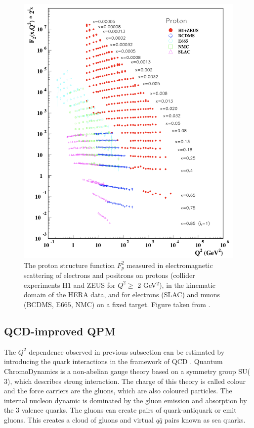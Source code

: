 \begin{figure}[!h]
  \centering
	\includegraphics[scale=0.65]{./gfx/F2.png}
	\caption{The proton structure function $F^2_p$ measured in electromagnetic scattering of electrons and positrons on protons (collider experiments H$1$ and ZEUS for $Q^2 \geq$ 2 GeV$^2$), in the kinematic domain of the HERA data, and for electrons (SLAC) and muons (BCDMS, E$665$, NMC) on a fixed target. Figure taken from \cite{PDG}.}
	\label{pic:F2}
\end{figure}

\subsection{QCD-improved QPM}

The $Q^2$ dependence observed in previous subsection can be estimated by introducing the quark interactions in the framework of QCD \cite{DISmeas,PICH}. Quantum ChromoDynamics is a non-abelian gauge theory based on a symmetry group SU($3$), which describes strong interaction. The charge of this theory is called colour and the force carriers are the gluons, which are also coloured particles. The internal nucleon dynamic is dominated by the gluon emission and absorption by the $3$ valence quarks. The gluons can create pairs of quark-antiquark or emit gluons. This creates a cloud of gluons and virtual $q\bar{q}$ pairs known as sea quarks.

